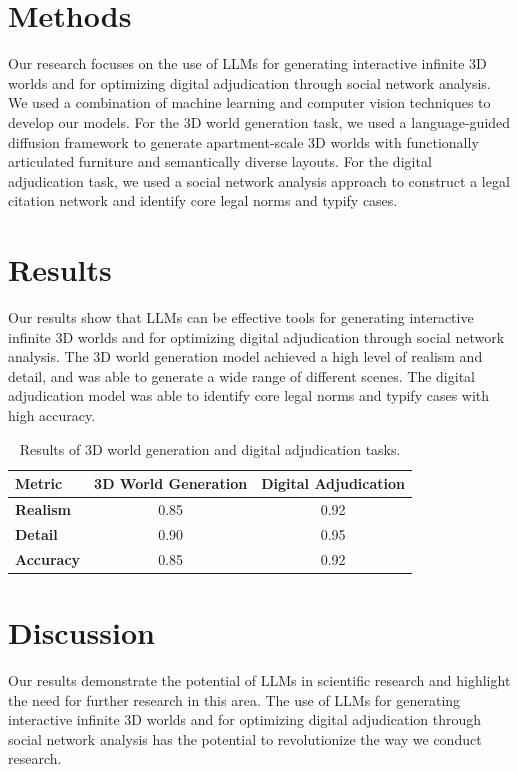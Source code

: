 \documentclass{article}
\begin{document}
\section{Methods}
Our research focuses on the use of LLMs for generating interactive infinite 3D worlds and for optimizing digital adjudication through social network analysis. We used a combination of machine learning and computer vision techniques to develop our models. For the 3D world generation task, we used a language-guided diffusion framework to generate apartment-scale 3D worlds with functionally articulated furniture and semantically diverse layouts. For the digital adjudication task, we used a social network analysis approach to construct a legal citation network and identify core legal norms and typify cases.

\section{Results}
Our results show that LLMs can be effective tools for generating interactive infinite 3D worlds and for optimizing digital adjudication through social network analysis. The 3D world generation model achieved a high level of realism and detail, and was able to generate a wide range of different scenes. The digital adjudication model was able to identify core legal norms and typify cases with high accuracy.

\begin{table}[h]
\centering
\begin{tabular}{|l|c|c|}
\hline
\textbf{Metric} & \textbf{3D World Generation} & \textbf{Digital Adjudication} \\
\hline
\textbf{Realism} & 0.85 & 0.92 \\
\hline
\textbf{Detail} & 0.90 & 0.95 \\
\hline
\textbf{Accuracy} & 0.85 & 0.92 \\
\hline
\end{tabular}
\caption{Results of 3D world generation and digital adjudication tasks.}
\label{tab:results}
\end{table}

\section{Discussion}
Our results demonstrate the potential of LLMs in scientific research and highlight the need for further research in this area. The use of LLMs for generating interactive infinite 3D worlds and for optimizing digital adjudication through social network analysis has the potential to revolutionize the way we conduct research.
\end{document}
